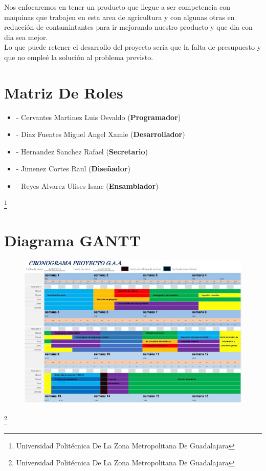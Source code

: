 \documentclass[11pt,a4paper]{article}
\begin{document}
Nos enfocaremos en tener un producto que llegue a ser competencia con maquinas que trabajen en esta area de agricultura y con algunas otras en reducción de contamintantes para ir mejorando nuestro producto y que dia con dia sea mejor.\\

Lo que puede retener el desarrollo del proyecto seria que la falta de presupuesto y que no empleé la solución al problema previsto.
 

 \section{Matriz De Roles}
 
 \begin{itemize}
 \item - Cervantes Martinez Luis Osvaldo (\textbf{Programador})
  \item - Diaz Fuentes Miguel Angel Xamie (\textbf{Desarrollador})
   \item - Hernandez Sanchez Rafael (\textbf{Secretario})
   \item - Jimenez Cortes Raul (\textbf{Diseñador})
 \item - Reyes Alvarez Ulises Isaac (\textbf{Ensamblador})
 \end{itemize}
 
 
 \footnote{Universidad Politécnica De La Zona Metropolitana De Guadalajara} 
\newpage

 \section{Diagrama GANTT}
 \begin{figure}[hbtp]
 \centering
  \includegraphics[scale=0.90]{Diagrama(01).png} 
 \end{figure}
  \footnote{Universidad Politécnica De La Zona Metropolitana De Guadalajara} 
\newpage
\end{document}
